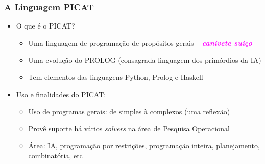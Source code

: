\begin{frame}[fragile]

  \frametitle{A Linguagem PICAT}
  \begin{itemize}
    \item O que é o PICAT?
    \pause
       \begin{itemize}
			\item Uma linguagem de programação de propósitos gerais -- \textcolor{magenta}{\textbf{\textit{canivete suiço}}}
			\item Uma evolução do PROLOG (consagrada linguagem dos primórdios da IA)
			\item Tem elementos das linguagens Python, Prolog e Haskell
		\end{itemize}

    \item Uso e finalidades do PICAT:
    \pause
       \begin{itemize}
			\item Uso de programas gerais: de simples à complexos (uma reflexão)
			\item Provê suporte há vários \textit{solvers} na área de Pesquisa Operacional
			\item Área: IA, programação por restrições, programação inteira, planejamento,
			combinatória, etc
		\end{itemize}

   \end{itemize}

  \end{frame}
    
